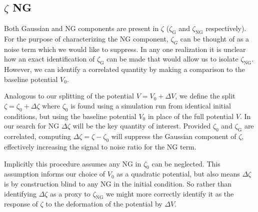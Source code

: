 




\subsection{$\zeta$ NG} \label{sec:zeta ng}

Both Gaussian and NG components are present in $\zeta$ ($\zeta_\mathrm{G}$ and $\zeta_\mathrm{NG}$ respectively).
For the purpose of characterizing the NG component, $\zeta_G$ can be thought of as a noise term which we would like to suppress.
In any one realization it is unclear how an exact identification of $\zeta_\mathrm{G}$ can be made that would allow us to isolate $\zeta_\mathrm{NG}$.
However, we can identify a correlated quantity by making a comparison to the baseline potential $V_0$.

Analogous to our splitting of the potential $V = V_0 + \Delta V$, we define the split $\zeta = \zeta_0 + \Delta\zeta$ where $\zeta_0$ is found using a simulation run from identical initial conditions, but using the baseline potential $V_0$ in place of the full potential $V$.
In our search for NG $\Delta\zeta$ will be the key quantity of interest.
Provided $\zeta_0$ and $\zeta_\mathrm{G}$ are correlated, computing $\Delta\zeta = \zeta - \zeta_0$ will suppress the Gaussian component of $\zeta$, effectively increasing the signal to noise ratio for the NG term.

Implicitly this procedure assumes any NG in $\zeta_0$ can be neglected.
This assumption informs our choice of $V_0$ as a quadratic potential, but also means $\Delta\zeta$ is by construction blind to any NG in the initial condition.
So rather than identifying $\Delta\zeta$ as a proxy to $\zeta_\mathrm{NG}$ we might more correctly identify it as the response of $\zeta$ to the deformation of the potential by $\Delta V$.

